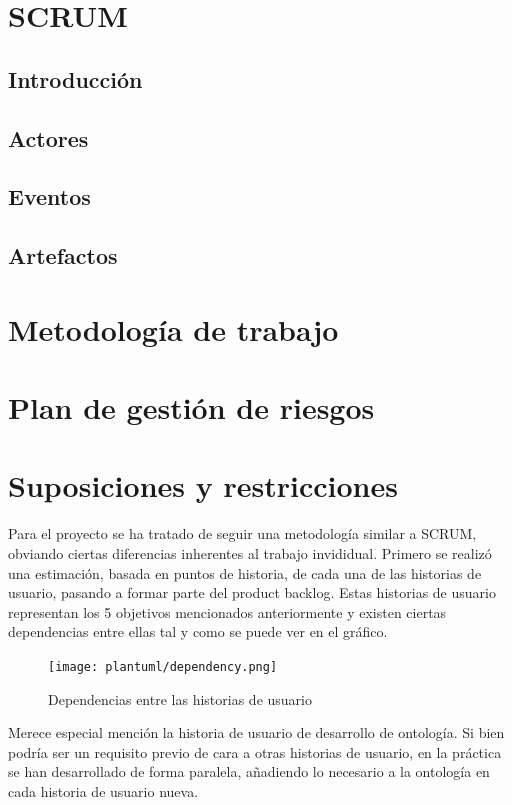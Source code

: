 \documentclass[12pt]{report} %
\begin{document}
\section{SCRUM}
\subsection{Introducción}
\subsection{Actores}
\subsection{Eventos}
\subsection{Artefactos}
\section{Metodología de trabajo}
\section{Plan de gestión de riesgos}
\section{Suposiciones y restricciones}
Para el proyecto se ha tratado de seguir una metodología similar a SCRUM, obviando ciertas diferencias inherentes al trabajo invididual.
Primero se realizó una estimación, basada en puntos de historia, de cada una de las historias de usuario, pasando a formar parte del product backlog.
Estas historias de usuario representan los 5 objetivos mencionados anteriormente y existen ciertas dependencias entre ellas tal y como se puede ver en el gráfico.

\begin{figure}[h]
    \centering
    \texttt{[image: plantuml/dependency.png]}
    \caption{Dependencias entre las historias de usuario}
    \label{fig:dependencia}
\end{figure}

Merece especial mención la historia de usuario de desarrollo de ontología. Si bien podría ser un requisito previo de cara a otras historias de usuario, en la práctica
se han desarrollado de forma paralela, añadiendo lo necesario a la ontología en cada historia de usuario nueva.
\end{document}
